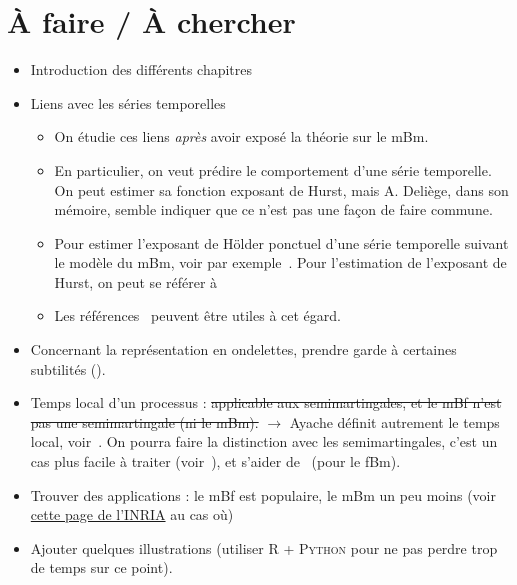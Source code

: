 



\section{À faire / À chercher}
\begin{itemize}
\item Introduction des différents chapitres
\item Liens avec les séries temporelles
  \begin{itemize}
  \item On étudie ces liens \emph{après} avoir exposé la théorie sur
    le mBm.
  \item En particulier, on veut prédire le comportement d'une série
    temporelle. On peut estimer sa fonction exposant de Hurst, mais
    A. Deliège, dans son mémoire, semble indiquer que ce n'est pas une
    façon de faire commune.
  \item Pour estimer l'exposant de Hölder ponctuel d'une série
    temporelle suivant le modèle du mBm, voir par
    exemple~\cite{jin2017}. Pour l'estimation de l'exposant de Hurst,
    on peut se référer à~\cite{coeurjolly2005, lebovits2018}
  \item Les références~\cite{garcin2016, garcin2021} peuvent être
    utiles à cet égard.
  \end{itemize}
\item Concernant la représentation en ondelettes, prendre garde à
  certaines subtilités (\cite{ayache2010}).
\item Temps local d'un processus : \st{applicable aux semimartingales,
    et le mBf n'est pas une semimartingale (ni le mBm).}
  $\longrightarrow$ Ayache définit autrement le temps local,
  voir~\cite[Sec.~2.2]{ayache2018}. On pourra faire la distinction
  avec les semimartingales, c'est un cas plus facile à traiter
  (voir~\cite[p.~13-14]{yen2013}), et s'aider
  de~\cite[Sec.~10.1]{biagini2008} (pour le fBm).
\item Trouver des applications : le mBf est populaire, le mBm un peu
  moins (voir
  \href{https://team.inria.fr/anja/english-theoretical-aspects/multifractional-brownian-motion/multifractional-brownian-motion-bibliography/}{cette page de l'INRIA}
  au cas où)
\item Ajouter quelques illustrations (utiliser \textsc{R} +
  \textsc{Python} pour ne pas perdre trop de temps sur ce point).
\end{itemize}